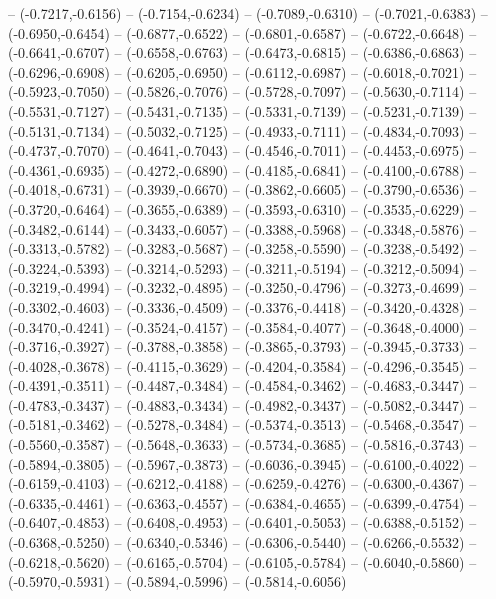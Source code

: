 {	-- (-0.7217,-0.6156)
	-- (-0.7154,-0.6234)
	-- (-0.7089,-0.6310)
	-- (-0.7021,-0.6383)
	-- (-0.6950,-0.6454)
	-- (-0.6877,-0.6522)
	-- (-0.6801,-0.6587)
	-- (-0.6722,-0.6648)
	-- (-0.6641,-0.6707)
	-- (-0.6558,-0.6763)
	-- (-0.6473,-0.6815)
	-- (-0.6386,-0.6863)
	-- (-0.6296,-0.6908)
	-- (-0.6205,-0.6950)
	-- (-0.6112,-0.6987)
	-- (-0.6018,-0.7021)
	-- (-0.5923,-0.7050)
	-- (-0.5826,-0.7076)
	-- (-0.5728,-0.7097)
	-- (-0.5630,-0.7114)
	-- (-0.5531,-0.7127)
	-- (-0.5431,-0.7135)
	-- (-0.5331,-0.7139)
	-- (-0.5231,-0.7139)
	-- (-0.5131,-0.7134)
	-- (-0.5032,-0.7125)
	-- (-0.4933,-0.7111)
	-- (-0.4834,-0.7093)
	-- (-0.4737,-0.7070)
	-- (-0.4641,-0.7043)
	-- (-0.4546,-0.7011)
	-- (-0.4453,-0.6975)
	-- (-0.4361,-0.6935)
	-- (-0.4272,-0.6890)
	-- (-0.4185,-0.6841)
	-- (-0.4100,-0.6788)
	-- (-0.4018,-0.6731)
	-- (-0.3939,-0.6670)
	-- (-0.3862,-0.6605)
	-- (-0.3790,-0.6536)
	-- (-0.3720,-0.6464)
	-- (-0.3655,-0.6389)
	-- (-0.3593,-0.6310)
	-- (-0.3535,-0.6229)
	-- (-0.3482,-0.6144)
	-- (-0.3433,-0.6057)
	-- (-0.3388,-0.5968)
	-- (-0.3348,-0.5876)
	-- (-0.3313,-0.5782)
	-- (-0.3283,-0.5687)
	-- (-0.3258,-0.5590)
	-- (-0.3238,-0.5492)
	-- (-0.3224,-0.5393)
	-- (-0.3214,-0.5293)
	-- (-0.3211,-0.5194)
	-- (-0.3212,-0.5094)
	-- (-0.3219,-0.4994)
	-- (-0.3232,-0.4895)
	-- (-0.3250,-0.4796)
	-- (-0.3273,-0.4699)
	-- (-0.3302,-0.4603)
	-- (-0.3336,-0.4509)
	-- (-0.3376,-0.4418)
	-- (-0.3420,-0.4328)
	-- (-0.3470,-0.4241)
	-- (-0.3524,-0.4157)
	-- (-0.3584,-0.4077)
	-- (-0.3648,-0.4000)
	-- (-0.3716,-0.3927)
	-- (-0.3788,-0.3858)
	-- (-0.3865,-0.3793)
	-- (-0.3945,-0.3733)
	-- (-0.4028,-0.3678)
	-- (-0.4115,-0.3629)
	-- (-0.4204,-0.3584)
	-- (-0.4296,-0.3545)
	-- (-0.4391,-0.3511)
	-- (-0.4487,-0.3484)
	-- (-0.4584,-0.3462)
	-- (-0.4683,-0.3447)
	-- (-0.4783,-0.3437)
	-- (-0.4883,-0.3434)
	-- (-0.4982,-0.3437)
	-- (-0.5082,-0.3447)
	-- (-0.5181,-0.3462)
	-- (-0.5278,-0.3484)
	-- (-0.5374,-0.3513)
	-- (-0.5468,-0.3547)
	-- (-0.5560,-0.3587)
	-- (-0.5648,-0.3633)
	-- (-0.5734,-0.3685)
	-- (-0.5816,-0.3743)
	-- (-0.5894,-0.3805)
	-- (-0.5967,-0.3873)
	-- (-0.6036,-0.3945)
	-- (-0.6100,-0.4022)
	-- (-0.6159,-0.4103)
	-- (-0.6212,-0.4188)
	-- (-0.6259,-0.4276)
	-- (-0.6300,-0.4367)
	-- (-0.6335,-0.4461)
	-- (-0.6363,-0.4557)
	-- (-0.6384,-0.4655)
	-- (-0.6399,-0.4754)
	-- (-0.6407,-0.4853)
	-- (-0.6408,-0.4953)
	-- (-0.6401,-0.5053)
	-- (-0.6388,-0.5152)
	-- (-0.6368,-0.5250)
	-- (-0.6340,-0.5346)
	-- (-0.6306,-0.5440)
	-- (-0.6266,-0.5532)
	-- (-0.6218,-0.5620)
	-- (-0.6165,-0.5704)
	-- (-0.6105,-0.5784)
	-- (-0.6040,-0.5860)
	-- (-0.5970,-0.5931)
	-- (-0.5894,-0.5996)
	-- (-0.5814,-0.6056)
}
